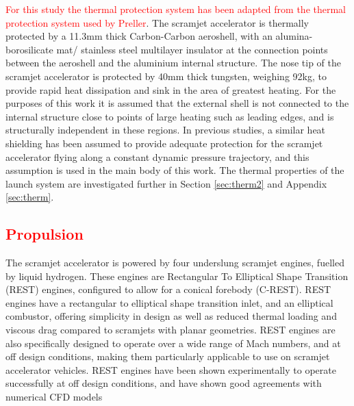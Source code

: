 \textcolor{red}{For this study the thermal protection system has been adapted from the thermal protection system used by Preller\cite{Preller2018a}}. The scramjet accelerator is thermally protected by a 11.3mm thick Carbon-Carbon aeroshell, with an alumina-borosilicate mat/ stainless steel multilayer insulator at the connection points between the aeroshell and the aluminium internal structure\cite{Preller2018a}. The nose tip of the scramjet accelerator is protected by 40mm thick tungsten, weighing 92kg, to provide rapid heat dissipation and sink in the area of greatest heating. For the purposes of this work it is assumed that the external shell is not connected to the internal structure close to points of large heating such as leading edges, and is structurally independent in these regions. 
In previous studies, a similar heat shielding has been assumed to provide adequate protection for the scramjet accelerator flying along a constant dynamic pressure trajectory\cite{Preller2018a}, and this assumption is used in the main body of this work. The thermal properties of the launch system are investigated further in Section \ref{sec:therm2} and Appendix \ref{sec:therm}.

\textcolor{red}{
\subsection{Propulsion}\label{sec:propulsion}
}
The scramjet accelerator is powered by four underslung scramjet engines, fuelled by liquid hydrogen. These engines are Rectangular To Elliptical Shape Transition (REST) engines, configured to allow for a conical forebody (C-REST). REST engines have a rectangular to elliptical shape transition inlet, and an elliptical combustor, offering simplicity in design as well as reduced thermal loading and viscous drag compared to scramjets with planar geometries\cite{Suraweera2009}.  REST engines are also specifically designed to operate over a wide range of Mach numbers, and at off design conditions, making them particularly applicable to use on scramjet accelerator vehicles. REST engines have been shown experimentally to operate successfully at off design conditions\cite{Smart2006,Smart2009b}, and have shown good agreements with numerical CFD models\cite{Smart2009b}



